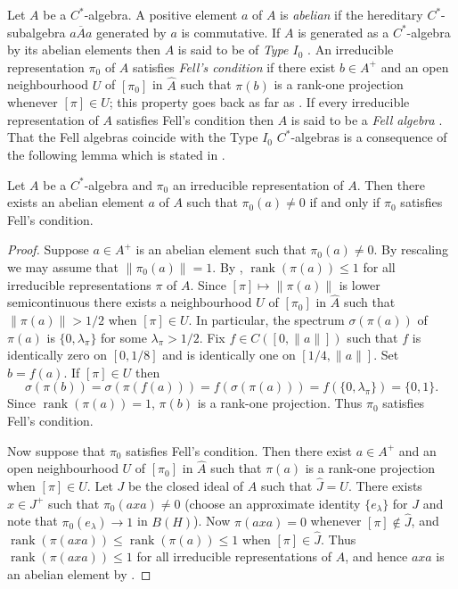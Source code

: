 \documentclass[12pt,a4paper]{amsart}
\newcommand{\rk}{\operatorname{rank}}
\begin{document}
Let $A$ be a $C^*$-algebra. A positive element $a$ of $A$ is
\emph{abelian} if the hereditary $C^*$-subalgebra
$\overline{aAa}$ generated by $a$ is commutative. If $A$ is
generated as a $C^*$-algebra by its abelian elements then $A$
is said to be of \emph{Type $I_0$} \cite[\S6.1]{Ped}.  An
irreducible representation $\pi_0$ of $A$ satisfies
\emph{Fell's condition}\label{pg-fell} if there exist $b\in A^+$ and an open
neighbourhood $U$ of $[\pi_0]$ in $\widehat{A}$ such that
$\pi(b)$ is a rank-one projection whenever $[\pi]\in U$; this
property goes back as far as \cite{Fell}. If every irreducible
representation of $A$ satisfies Fell's condition then $A$ is
said to be a \emph{Fell algebra} \cite[\S3]{AS}. That the Fell
algebras coincide with the Type $I_0$ $C^*$-algebras is a
consequence of the following lemma which is stated in
\cite[\S3]{AS}.

\begin{lemma}\label{lem-elementary?}
Let $A$ be a $C^*$-algebra and $\pi_0$ an irreducible
representation of $A$. Then there exists  an abelian element
$a$ of $A$ such that $\pi_0(a)\neq 0$ if and only if $\pi_0$
satisfies Fell's condition.
\end{lemma}
\begin{proof}
Suppose $a\in A^+$ is an abelian element such that $\pi_0(a)\neq
0$.  By rescaling we may assume that $\|\pi_0(a)\|=1$. By
\cite[Lemma~6.1.3]{Ped}, $\rk(\pi(a))\leq 1$ for all irreducible
representations $\pi$ of $A$.  Since $[\pi]\mapsto\|\pi(a)\|$ is
lower semicontinuous there exists a neighbourhood $U$ of
$[\pi_0]$ in $\hat A$ such that $\|\pi(a)\|>1/2$ when $[\pi]\in
U$. In particular, the spectrum $\sigma(\pi(a))$ of $\pi(a)$ is
$\{0,\lambda_\pi\}$ for some $\lambda_\pi>1/2$.  Fix $f\in
C([0,\|a\|])$ such that $f$ is identically zero on $[0,1/8]$ and
is identically one on $[1/4,\|a\|]$.  Set $b=f(a)$. If $[\pi]\in
U$ then
\[
\sigma(\pi(b))
    =\sigma(\pi(f(a)))
    =f(\sigma(\pi(a)))
    =f(\{0,\lambda_\pi\})
    =\{0,1\}.
\]
Since $\rk(\pi(a)) = 1$,  $\pi(b)$ is a rank-one
projection. Thus $\pi_0$ satisfies Fell's condition.

Now suppose that $\pi_0$ satisfies Fell's condition. Then there
exist $a\in A^+$ and an open neighbourhood $U$ of $[\pi_0]$ in
$\widehat{A}$ such that $\pi(a)$ is a  rank-one projection when
$[\pi]\in U$. Let $J$ be the closed ideal of $A$ such that
$\widehat{J}=U$.  There exists $x\in J^+$ such that
$\pi_0(axa)\neq 0$ (choose an approximate identity
$\{e_\lambda\}$ for $J$ and note that $\pi_0(e_\lambda)\to 1$
in $B(H)$).  Now $\pi(axa)=0$ whenever $[\pi]\not\in
\widehat{J}$, and $\rk(\pi(axa))\leq \rk(\pi(a))\leq 1$ when
$[\pi]\in\widehat{J}$. Thus $\rk(\pi(axa))\leq 1$ for all
irreducible representations of $A$, and  hence $axa$ is an
abelian element by \cite[Lemma~6.1.3]{Ped}.
\end{proof}
\end{document}
